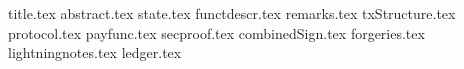 \documentclass[11pt]{llncs}
\begin{document}
\pagestyle{plain}
{title.tex}
{abstract.tex}
{state.tex}
{functdescr.tex}
{remarks.tex}
{txStructure.tex}
{protocol.tex}
{payfunc.tex}
{secproof.tex}
{combinedSign.tex}
{forgeries.tex}
{lightningnotes.tex}
{ledger.tex}


\end{document}
